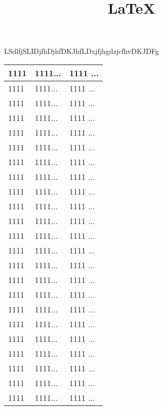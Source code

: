 \documentclass[11pt,a4paper]{article}
\title{LaTeX}    %
\author{}
\date{}
\begin{document}
  \maketitle
LSdlfjSLIDjfhDjhfDKJhfLDxjfjhgdzjcfhvDKJDFg
\begin{tabular}{|l|l|l|} %
\hline %
1111 & 1111... &1111 ... \\     %
\hline %
1111 & 1111... & 1111 ... \\	%
1111 & 1111... & 1111 ... \\
1111 & 1111... &1111 ... \\
1111 & 1111... &1111 ... \\
1111 & 1111... &1111 ... \\
1111 & 1111... &1111 ... \\
1111 & 1111... &1111 ... \\
1111 & 1111... &1111 ... \\
1111 & 1111... &1111 ... \\
1111 & 1111... &1111 ... \\
1111 & 1111... &1111 ... \\
1111 & 1111... &1111 ... \\
1111 & 1111... &1111 ... \\
1111 & 1111... &1111 ... \\
1111 & 1111... &1111 ... \\
1111 & 1111... &1111 ... \\
1111 & 1111... &1111 ... \\
1111 & 1111... &1111 ... \\
1111 & 1111... &1111 ... \\
1111 & 1111... &1111 ... \\
1111 & 1111... &1111 ... \\
1111 & 1111... &1111 ... \\
\hline %
\end{tabular}
\end{document}
